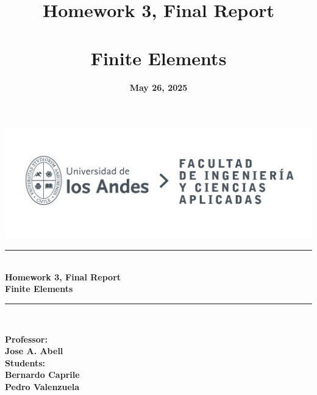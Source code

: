 \documentclass[12pt]{article}
\title{\textbf{Homework 3, Final Report\\ \vspace{0.5cm} \\ Finite Elements}}
\date{\textbf{May 26, 2025}}
\begin{document}
\makeatletter
\begin{titlepage}
    \begin{center}
        \vspace{2cm}
        \includegraphics[width=0.8\linewidth]{LOGO_UNIVERSIDAD.jpg}\\[10ex]
        
        \rule{\textwidth}{1pt} \\[2ex]
        {\LARGE \textbf{Homework 3, Final Report\\ \vspace{0.5cm} Finite Elements}}\\[2ex]
        \rule{\textwidth}{1pt} \\[10ex]

        \vfill

        \begin{flushright}
            \textbf{Professor:\\
             Jose A. Abell} \\[0.3cm]
            \textbf{Students: \\
            Bernardo Caprile\\
            Pedro Valenzuela} \\[0.3cm]
        \end{flushright}
        
        \vspace*{1cm}
        {\normalsize \@date}
    \end{center}
\end{titlepage}
\makeatother


\pagestyle{fancy}
\fancyhf{}
\rhead{\shorttitle}


\rfoot{\thepage}
\renewcommand{\footrulewidth}{0.5pt}

\tableofcontents
\end{document}
